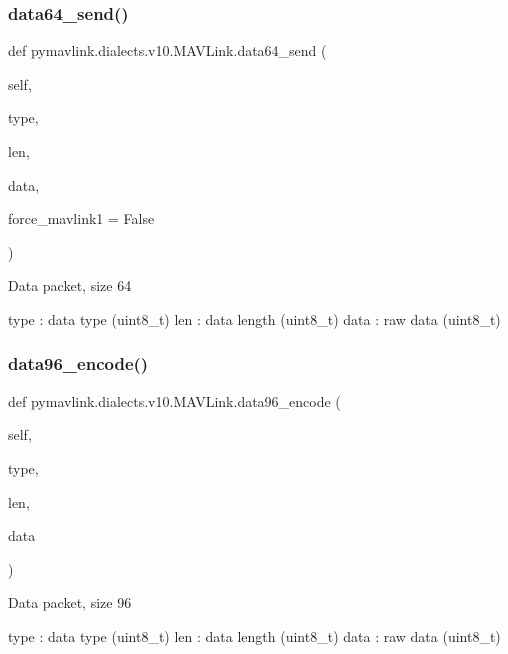 \begin{DoxyVerb}
\begin{DoxyVerb}
\subsubsection{\texorpdfstring{data64\+\_\+send()}{data64\_send()}}
{\footnotesize\ttfamily def pymavlink.\+dialects.\+v10.\+M\+A\+V\+Link.\+data64\+\_\+send (\begin{DoxyParamCaption}\item[{}]{self,  }\item[{}]{type,  }\item[{}]{len,  }\item[{}]{data,  }\item[{}]{force\+\_\+mavlink1 = {\ttfamily False} }\end{DoxyParamCaption})}

\begin{DoxyVerb}Data packet, size 64

type                      : data type (uint8_t)
len                       : data length (uint8_t)
data                      : raw data (uint8_t)\end{DoxyVerb}
 \mbox{\label{classpymavlink_1_1dialects_1_1v10_1_1MAVLink_a465fa101ba242e53a8d226eaa857dc66}} 
\subsubsection{\texorpdfstring{data96\+\_\+encode()}{data96\_encode()}}
{\footnotesize\ttfamily def pymavlink.\+dialects.\+v10.\+M\+A\+V\+Link.\+data96\+\_\+encode (\begin{DoxyParamCaption}\item[{}]{self,  }\item[{}]{type,  }\item[{}]{len,  }\item[{}]{data }\end{DoxyParamCaption})}

\begin{DoxyVerb}Data packet, size 96

type                      : data type (uint8_t)
len                       : data length (uint8_t)
data                      : raw data (uint8_t)\end{DoxyVerb}
 \mbox{\label{classpymavlink_1_1dialects_1_1v10_1_1MAVLink_a85bd551cf12569e5507f4c5a4335c39e}} 

\end{DoxyVerb}
\end{DoxyVerb}
